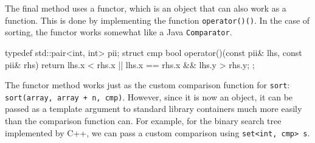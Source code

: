 The final method uses a functor, which is an object that can also work as a function. This is done by implementing the function \texttt{operator()()}. In the case of sorting, the functor works somewhat like a Java \texttt{Comparator}.

\begin{mylstlisting}[language=C++]
typedef std::pair<int, int> pii;
struct cmp {
	bool operator()(const pii& lhs, const pii& rhs) {
		return lhs.x < rhs.x || lhs.x == rhs.x && lhs.y > rhs.y;
	}
};
\end{mylstlisting}

The functor method works just as the custom comparison function for \texttt{sort}: \texttt{sort(array, array + n, cmp)}. However, since it is now an object, it can be passed as a template argument to standard library containers much more easily than the comparison function can. For example, for the binary search tree implemented by C++, we can pass a custom comparison using \texttt{set<int, cmp> s}.

